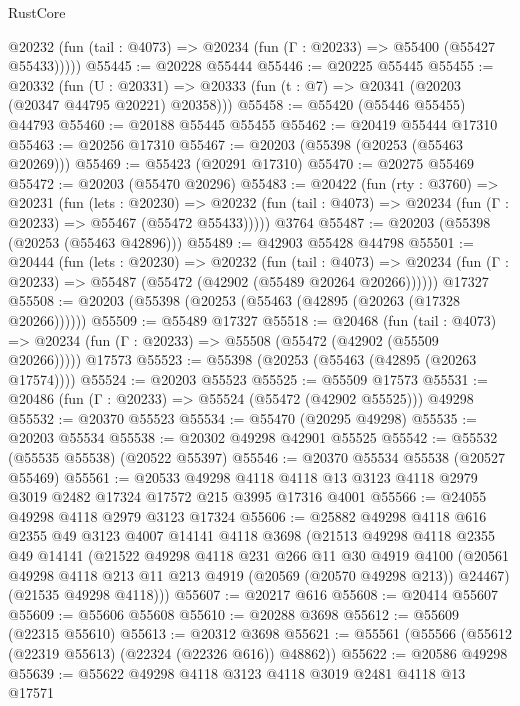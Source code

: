 \begin{lexlean}{RustCore}
\begin{coremodule}
      @20232 (fun (tail : @4073) => @20234 (fun (Γ : @20233) => @55400 (@55427 @55433)))))
@55445 := @20228 @55444
@55446 := @20225 @55445
@55455 := @20332
    (fun (U : @20331) => @20333 (fun (t : @7) => @20341 (@20203 (@20347 @44795 @20221) @20358)))
@55458 := @55420 (@55446 @55455) @44793
@55460 := @20188 @55445 @55455
@55462 := @20419 @55444 @17310
@55463 := @20256 @17310
@55467 := @20203 (@55398 (@20253 (@55463 @20269)))
@55469 := @55423 (@20291 @17310)
@55470 := @20275 @55469
@55472 := @20203 (@55470 @20296)
@55483 := @20422
    (fun (rty : @3760) =>
    @20231
      (fun (lets : @20230) =>
      @20232 (fun (tail : @4073) => @20234 (fun (Γ : @20233) => @55467 (@55472 @55433)))))
    @3764
@55487 := @20203 (@55398 (@20253 (@55463 @42896)))
@55489 := @42903 @55428 @44798
@55501 := @20444
    (fun (lets : @20230) =>
    @20232
      (fun (tail : @4073) =>
      @20234 (fun (Γ : @20233) => @55487 (@55472 (@42902 (@55489 @20264 @20266))))))
    @17327
@55508 := @20203 (@55398 (@20253 (@55463 (@42895 (@20263 (@17328 @20266))))))
@55509 := @55489 @17327
@55518 := @20468
    (fun (tail : @4073) => @20234 (fun (Γ : @20233) => @55508 (@55472 (@42902 (@55509 @20266)))))
    @17573
@55523 := @55398 (@20253 (@55463 (@42895 (@20263 @17574))))
@55524 := @20203 @55523
@55525 := @55509 @17573
@55531 := @20486 (fun (Γ : @20233) => @55524 (@55472 (@42902 @55525))) @49298
@55532 := @20370 @55523
@55534 := @55470 (@20295 @49298)
@55535 := @20203 @55534
@55538 := @20302 @49298 @42901 @55525
@55542 := @55532 (@55535 @55538) (@20522 @55397)
@55546 := @20370 @55534 @55538 (@20527 @55469)
@55561 := @20533
    @49298
    @4118
    @4118
    @13
    @3123
    @4118
    @2979
    @3019
    @2482
    @17324
    @17572
    @215
    @3995
    @17316
    @4001
@55566 := @24055 @49298 @4118 @2979 @3123 @17324
@55606 := @25882
    @49298
    @4118
    @616
    @2355
    @49
    @3123
    @4007
    @14141
    @4118
    @3698
    (@21513
      @49298
      @4118
      @2355
      @49
      @14141
      (@21522
        @49298
        @4118
        @231
        @266
        @11
        @30
        @4919
        @4100
        (@20561 @49298 @4118 @213 @11 @213 @4919 (@20569 (@20570 @49298 @213)) @24467)
        (@21535 @49298 @4118)))
@55607 := @20217 @616
@55608 := @20414 @55607
@55609 := @55606 @55608
@55610 := @20288 @3698
@55612 := @55609 (@22315 @55610)
@55613 := @20312 @3698
@55621 := @55561 (@55566 (@55612 (@22319 @55613) (@22324 (@22326 @616)) @48862))
@55622 := @20586 @49298
@55639 := @55622
    @49298
    @4118
    @3123
    @4118
    @3019
    @2481
    @4118
    @13
    @17571

\end{coremodule}
\end{lexlean}

